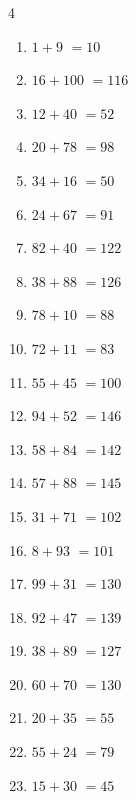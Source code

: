 \begin{multicols}{4}
\begin{enumerate}
  \item $1+9$
        $=10$

  \item $16+100$
        $=116$

  \item $12+40$
        $=52$

  \item $20+78$
        $=98$

  \item $34+16$
        $=50$

  \item $24+67$
        $=91$

  \item $82+40$
        $=122$

  \item $38+88$
        $=126$

  \item $78+10$
        $=88$

  \item $72+11$
        $=83$

\columnbreak %

  \item $55+45$
        $=100$

  \item $94+52$
        $=146$

  \item $58+84$
        $=142$

  \item $57+88$
        $=145$

  \item $31+71$
        $=102$

  \item $8+93$
        $=101$

  \item $99+31$
        $=130$

  \item $92+47$
        $=139$

  \item $38+89$
        $=127$

  \item $60+70$
        $=130$

  \item $20+35$
        $=55$

  \item $55+24$
        $=79$

  \item $15+30$
        $=45$


\end{enumerate}
\end{multicols}
